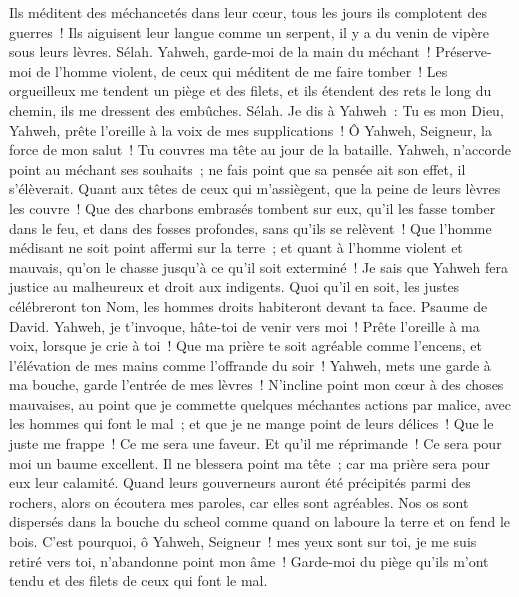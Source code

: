 \begin{multicols}{2}
Ils méditent des méchancetés dans leur cœur, tous les jours ils complotent des guerres~!
Ils aiguisent leur langue comme un serpent, il y a du venin de vipère sous leurs lèvres. Sélah.
Yahweh, garde-moi de la main du méchant~! Préserve-moi de l'homme violent, de ceux qui méditent de me faire tomber~!
Les orgueilleux me tendent un piège et des filets, et ils étendent des rets le long du chemin, ils me dressent des embûches. Sélah.
Je dis à Yahweh~: Tu es mon Dieu, Yahweh, prête l'oreille à la voix de mes supplications~!
Ô Yahweh, Seigneur, la force de mon salut~! Tu couvres ma tête au jour de la bataille.
Yahweh, n'accorde point au méchant ses souhaits~; ne fais point que sa pensée ait son effet, il s'élèverait.  
Quant aux têtes de ceux qui m'assiègent, que la peine de leurs lèvres les couvre~!
Que des charbons embrasés tombent sur eux, qu'il les fasse tomber dans le feu, et dans des fosses profondes, sans qu'ils se relèvent~!
Que l'homme médisant ne soit point affermi sur la terre~; et quant à l'homme violent et mauvais, qu'on le chasse jusqu'à ce qu'il soit exterminé~!
Je sais que Yahweh fera justice au malheureux et droit aux indigents.
Quoi qu'il en soit, les justes célébreront ton Nom, les hommes droits habiteront devant ta face.
\VerseOne{}Psaume de David. Yahweh, je t'invoque, hâte-toi de venir vers moi~! Prête l'oreille à ma voix, lorsque je crie à toi~!
Que ma prière te soit agréable comme l'encens, et l'élévation de mes mains comme l'offrande du soir~!
Yahweh, mets une garde à ma bouche, garde l'entrée de mes lèvres~!
N'incline point mon cœur à des choses mauvaises, au point que je commette quelques méchantes actions par malice, avec les hommes qui font le mal~; et que je ne mange point de leurs délices~!
Que le juste me frappe~! Ce me sera une faveur. Et qu'il me réprimande~! Ce sera pour moi un baume excellent. Il ne blessera point ma tête~; car ma prière sera pour eux leur calamité.
Quand leurs gouverneurs auront été précipités parmi des rochers, alors on écoutera mes paroles, car elles sont agréables.
Nos os sont dispersés dans la bouche du scheol comme quand on laboure la terre et on fend le bois.
C'est pourquoi, ô Yahweh, Seigneur~! mes yeux sont sur toi, je me suis retiré vers toi, n'abandonne point mon âme~!
Garde-moi du piège qu'ils m'ont tendu et des filets de ceux qui font le mal.

\end{multicols}
